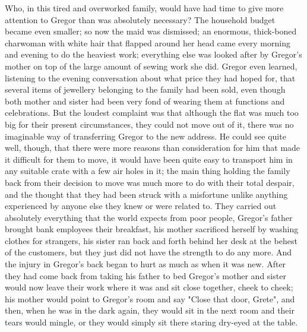 \documentclass[12pt]{book}
\begin{document}
    Who, in this tired and overworked family, would have had time to give more attention to Gregor than was absolutely necessary? The household budget became even smaller; so now the maid was dismissed; an enormous, thick-boned charwoman with white hair that flapped around her head came every morning and evening to do the heaviest work; everything else was looked after by Gregor's mother on top of the large amount of sewing work she did. Gregor even learned, listening to the evening conversation about what price they had hoped for, that several items of jewellery belonging to the family had been sold, even though both mother and sister had been very fond of wearing them at functions and celebrations. But the loudest complaint was that although the flat was much too big for their present circumstances, they could not move out of it, there was no imaginable way of transferring Gregor to the new address. He could see quite well, though, that there were more reasons than consideration for him that made it difficult for them to move, it would have been quite easy to transport him in any suitable crate with a few air holes in it; the main thing holding the family back from their decision to move was much more to do with their total despair, and the thought that they had been struck with a misfortune unlike anything experienced by anyone else they knew or were related to. They carried out absolutely everything that the world expects from poor people, Gregor's father brought bank employees their breakfast, his mother sacrificed herself by washing clothes for strangers, his sister ran back and forth behind her desk at the behest of the customers, but they just did not have the strength to do any more. And the injury in Gregor's back began to hurt as much as when it was new. After they had come back from taking his father to bed Gregor's mother and sister would now leave their work where it was and sit close together, cheek to cheek; his mother would point to Gregor's room and say "Close that door, Grete", and then, when he was in the dark again, they would sit in the next room and their tears would mingle, or they would simply sit there staring dry-eyed at the table.
\end{document}
